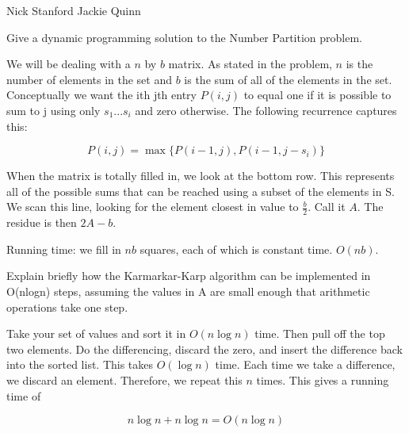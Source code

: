 \documentclass[solution, letterpaper]{cs124}
\begin{document}


\setcounter{Part}{1}
 \begin{center}
Nick Stanford Jackie Quinn
 \end{center}

\problem{} 
Give a dynamic programming solution to the Number Partition problem.

\subsolution


We will be dealing with a $n$ by $b$ matrix. As stated in the problem, $n$ is the number of elements in the set and $b$ is the sum of all of the elements in the set. Conceptually we want the ith jth entry $P(i,j)$ to equal one if it is possible to sum to j using only $s_1 ... s_i$ and zero otherwise. The following recurrence captures this:

$$P(i,j) = \max{\{P(i-1,j), P(i-1,j-s_i)\}} $$

When the matrix is totally filled in, we look at the bottom row. This represents all of the possible sums that can be reached using a subset of the elements in S. We scan this line, looking for the element closest in value to $\frac{b}{2}$. Call it $A$. The residue is then $2A-b$.

Running time: we fill in $nb$ squares, each of which is constant time. $O(nb)$. 

\problem{} 
Explain brieﬂy how the Karmarkar-Karp algorithm can be implemented in O(nlogn) steps, assuming the values in A are small enough that arithmetic operations take one step.

\subsolution Take your set of values and sort it in $O(n \log{n})$ time. Then pull off the top two elements. Do the differencing, discard the zero, and insert the difference back into the sorted list. This takes $O(\log{n})$ time. Each time we take a difference, we discard an element. Therefore, we repeat this $n$ times. This gives a running time of

$$ n \log{n} + n \log{n} = O(n\log{n}) $$


\end{document}
